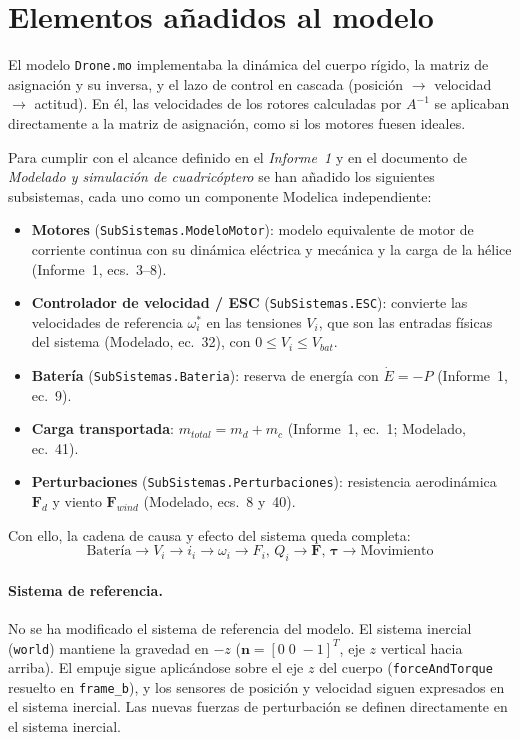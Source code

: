 \section{Elementos añadidos al modelo}
\label{sec:resumen}

El modelo \texttt{Drone.mo} implementaba la dinámica del cuerpo rígido, la matriz de
asignación y su inversa, y el lazo de control en cascada
(posición $\rightarrow$ velocidad $\rightarrow$ actitud). En él, las velocidades de los
rotores calculadas por $A^{-1}$ se aplicaban directamente a la matriz de asignación,
como si los motores fuesen ideales.

Para cumplir con el alcance definido en el \emph{Informe~1} y en el documento de
\emph{Modelado y simulación de cuadricóptero} se han añadido los siguientes
subsistemas, cada uno como un componente Modelica independiente:

\begin{itemize}
  \item \textbf{Motores} (\texttt{SubSistemas.ModeloMotor}): modelo equivalente de
        motor de corriente continua con su dinámica eléctrica y mecánica y la carga
        de la hélice (Informe~1, ecs.~3--8).
  \item \textbf{Controlador de velocidad / ESC} (\texttt{SubSistemas.ESC}): convierte
        las velocidades de referencia $\omega_i^{*}$ en las tensiones $V_i$, que son
        las entradas físicas del sistema (Modelado, ec.~32), con
        $0 \le V_i \le V_{bat}$.
  \item \textbf{Batería} (\texttt{SubSistemas.Bateria}): reserva de energía con
        $\dot E = -P$ (Informe~1, ec.~9).
  \item \textbf{Carga transportada}: $m_{total} = m_d + m_c$ (Informe~1, ec.~1;
        Modelado, ec.~41).
  \item \textbf{Perturbaciones} (\texttt{SubSistemas.Perturbaciones}): resistencia
        aerodinámica $\mathbf{F}_d$ y viento $\mathbf{F}_{wind}$ (Modelado, ecs.~8
        y~40).
\end{itemize}

Con ello, la cadena de causa y efecto del sistema queda completa:
\begin{equation}
  \text{Batería} \rightarrow V_i \rightarrow i_i \rightarrow \omega_i
  \rightarrow F_i,\,Q_i \rightarrow \mathbf{F},\,\boldsymbol{\tau}
  \rightarrow \text{Movimiento}
\end{equation}

\paragraph{Sistema de referencia.} No se ha modificado el sistema de referencia del
modelo. El sistema inercial (\texttt{world}) mantiene la gravedad en $-z$
($\mathbf{n} = [0\;0\;-1]^T$, eje $z$ vertical hacia arriba). El empuje sigue
aplicándose sobre el eje $z$ del cuerpo (\texttt{forceAndTorque} resuelto en
\texttt{frame\_b}), y los sensores de posición y velocidad siguen expresados en el
sistema inercial. Las nuevas fuerzas de perturbación se definen directamente en el
sistema inercial.
